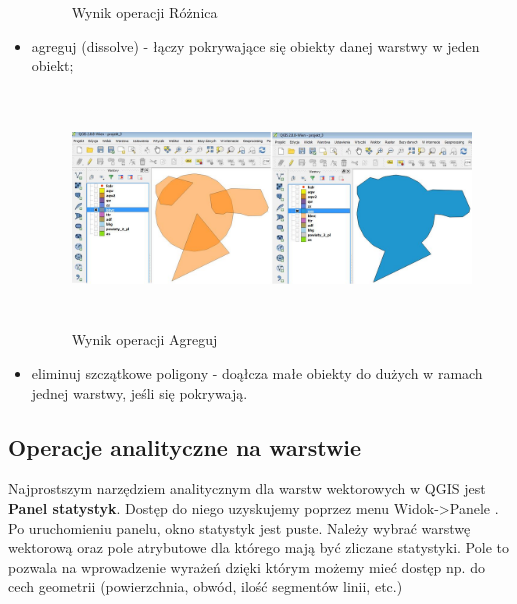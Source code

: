 \documentclass[12pt,a4paper]{book}
\begin{document}
\begin{itemize}
\begin{center}
\begin{figure}
\caption{Wynik operacji Różnica}
\end{figure}
\end{center}
\item agreguj (dissolve) - łączy pokrywające się obiekty danej warstwy w jeden obiekt;
\begin{center}
\begin{figure}
\includegraphics[width=16.365cm,height=6.244cm]{003-agreguj.jpg}
\caption{Wynik operacji Agreguj}
\end{figure}
\end{center}
\item eliminuj szczątkowe poligony - doąłcza małe obiekty do dużych w ramach jednej warstwy, jeśli się pokrywają.
\end{itemize}
\subsection{Operacje analityczne na warstwie}
Najprostszym narzędziem analitycznym dla warstw wektorowych w QGIS jest \textbf{Panel statystyk}. Dostęp do niego uzyskujemy poprzez menu  Widok-{\textgreater}Panele . Po uruchomieniu panelu, okno statystyk jest puste. Należy wybrać warstwę wektorową oraz pole atrybutowe dla którego mają być zliczane statystyki. Pole to pozwala na wprowadzenie wyrażeń dzięki którym możemy mieć dostęp np. do cech geometrii (powierzchnia, obwód, ilość segmentów linii, etc.)
\end{document}
